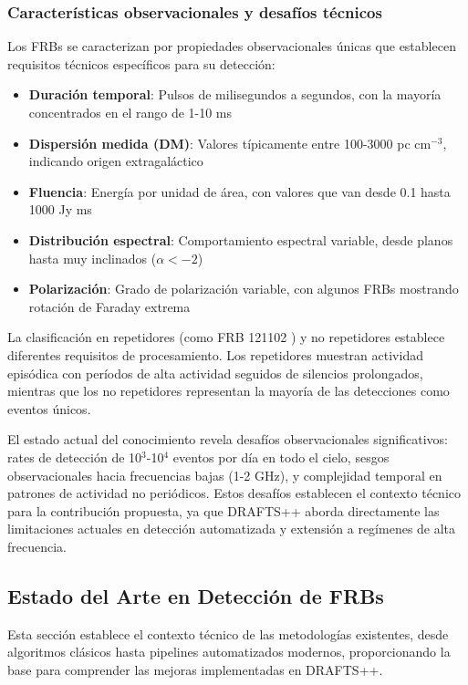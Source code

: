 \subsubsection{Características observacionales y desafíos técnicos}

Los FRBs se caracterizan por propiedades observacionales únicas que establecen requisitos técnicos específicos para su detección:

\begin{itemize}
    \item \textbf{Duración temporal}: Pulsos de milisegundos a segundos, con la mayoría concentrados en el rango de 1-10 ms
    \item \textbf{Dispersión medida (DM)}: Valores típicamente entre 100-3000 pc cm$^{-3}$, indicando origen extragaláctico
    \item \textbf{Fluencia}: Energía por unidad de área, con valores que van desde 0.1 hasta 1000 Jy ms
    \item \textbf{Distribución espectral}: Comportamiento espectral variable, desde planos hasta muy inclinados ($\alpha < -2$)
    \item \textbf{Polarización}: Grado de polarización variable, con algunos FRBs mostrando rotación de Faraday extrema
\end{itemize}

La clasificación en repetidores (como FRB 121102 \cite{cruces2020frb121102}) y no repetidores establece diferentes requisitos de procesamiento. Los repetidores muestran actividad episódica con períodos de alta actividad seguidos de silencios prolongados, mientras que los no repetidores representan la mayoría de las detecciones como eventos únicos.

El estado actual del conocimiento revela desafíos observacionales significativos: rates de detección de 10$^3$-10$^4$ eventos por día en todo el cielo, sesgos observacionales hacia frecuencias bajas (1-2 GHz), y complejidad temporal en patrones de actividad no periódicos. Estos desafíos establecen el contexto técnico para la contribución propuesta, ya que DRAFTS++ aborda directamente las limitaciones actuales en detección automatizada y extensión a regímenes de alta frecuencia.

\subsection{Estado del Arte en Detección de FRBs}

Esta sección establece el contexto técnico de las metodologías existentes, desde algoritmos clásicos hasta pipelines automatizados modernos, proporcionando la base para comprender las mejoras implementadas en DRAFTS++.

